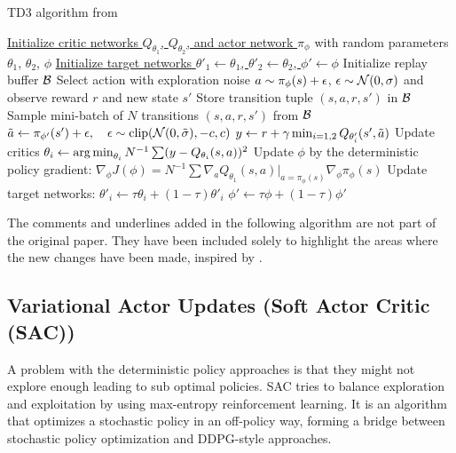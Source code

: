 \begin{algorithm}[H]
   \caption{TD3 algorithm from \cite{fujimoto2018addressingfunctionapproximationerror}}
   \label{algo:TD3}
\begin{algorithmic}
   \STATE {}\ul{Initialize critic networks $Q_{\theta_1}$, $Q_{\theta_2}$, and actor network $\pi_\phi$} 
   with random parameters $\theta_1$, $\theta_2$, $\phi$
   \STATE {}\ul{Initialize target networks $\theta'_1 \leftarrow \theta_1$, $\theta'_2 \leftarrow 
   \theta_2$, $\phi' \leftarrow \phi$}
   \STATE Initialize replay buffer $\mathcal{B}$
   \STATE Select action with exploration noise $a \sim \pi_\phi(s) + \epsilon$, 
   \STATE $\epsilon \sim \mathcal{N}(0, \sigma)$ and observe reward $r$ and new state $s'$
   \STATE Store transition tuple $(s, a, r, s')$ in $\mathcal{B}$ 
   \STATE 
   \STATE Sample mini-batch of $N$ transitions $(s, a, r, s')$ from $\mathcal{B}$
   \STATE $\tilde a \leftarrow \pi_{\phi'}(s') + \epsilon, \quad \epsilon \sim \operatorname*{clip}(\mathcal{N}(0, \tilde {\sigma}), -c, c)$  
   \COMMENT{\textcolor{red}{Target policy smoothing}}
   \STATE $y \leftarrow r + \gamma \min_{i=1,2} Q_{\theta'_i}(s', \tilde a)$  \COMMENT{\textcolor{red}{Clipped Double Q-Learning}}
   \STATE Update critics $\theta_i \leftarrow \operatorname*{arg\,min}_{\theta_i} N^{-1} \sum (y - Q_{\theta_i}(s,a))^2$
   \STATE Update $\phi$ by the deterministic policy gradient: 
   \STATE $\nabla_{\phi} J(\phi) = N^{-1} \sum \nabla_{a} Q_{\theta_1}(s, a) |_{a=\pi_{\phi}(s)} \nabla_{\phi} \pi_\phi(s)$
   \STATE Update target networks:
   \STATE $\theta'_i \leftarrow \tau \theta_i + (1 - \tau) \theta'_i$
   \STATE $\phi' \leftarrow \tau \phi + (1 - \tau) \phi'$
   \ENDIF
   \ENDFOR
\end{algorithmic}
\end{algorithm}
The comments and underlines added in the following algorithm are not part of the original paper.
They have been included solely to highlight the areas where the new changes have been made, inspired by \cite{Lil'Log_PG}.

\subsection{Variational Actor Updates (Soft Actor Critic (SAC))}\label{SAC}
A problem with the deterministic policy approaches is that they might not explore enough leading to sub optimal policies.
SAC \cite{haarnoja2018softactorcriticoffpolicymaximum} tries to balance exploration and exploitation by using max-entropy reinforcement learning.
It is an algorithm that optimizes a stochastic policy in an off-policy way, forming a bridge between stochastic 
policy optimization and DDPG-style approaches.

